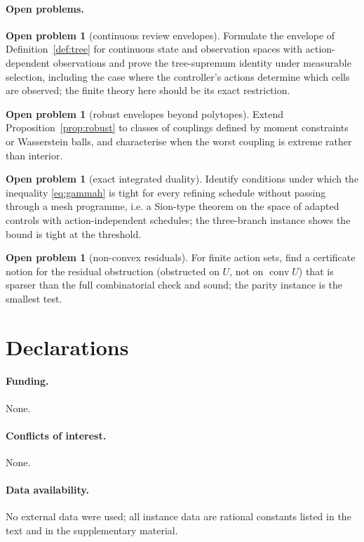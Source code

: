 \documentclass[11pt,a4paper]{article}
\theoremstyle{plain}
\theoremstyle{definition}
\newtheorem{openproblem}[theorem]{Open problem}
\theoremstyle{remark}
\newcommand{\conv}{\operatorname{conv}}
\begin{document}
\paragraph{Open problems.}
\begin{openproblem}[continuous review envelopes]\label{op:continuous}
Formulate the envelope of Definition~\ref{def:tree} for continuous state and observation spaces with action-dependent observations and prove the tree-supremum identity under measurable selection, including the case where the controller's actions determine which cells are observed; the finite theory here should be its exact restriction.
\end{openproblem}
\begin{openproblem}[robust envelopes beyond polytopes]\label{op:robust}
Extend Proposition~\ref{prop:robust} to classes of couplings defined by moment constraints or Wasserstein balls, and characterise when the worst coupling is extreme rather than interior.
\end{openproblem}
\begin{openproblem}[exact integrated duality]\label{op:integrated}
Identify conditions under which the inequality \eqref{eq:gammah} is tight for every refining schedule without passing through a mesh programme, i.e. a Sion-type theorem on the space of adapted controls with action-independent schedules; the three-branch instance shows the bound is tight at the threshold.
\end{openproblem}
\begin{openproblem}[non-convex residuals]\label{op:nonconvex}
For finite action sets, find a certificate notion for the residual obstruction (obstructed on $U$, not on $\conv U$) that is sparser than the full combinatorial check and sound; the parity instance is the smallest test.
\end{openproblem}
\section*{Declarations}
\paragraph{Funding.} None.
\paragraph{Conflicts of interest.} None.
\paragraph{Data availability.} No external data were used; all instance data are rational constants listed in the text and in the supplementary material.
\end{document}
